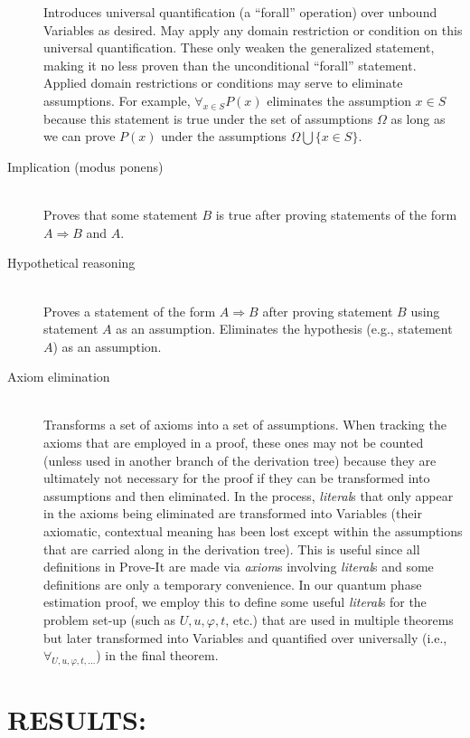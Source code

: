 \documentclass{article}[12pt]
\begin{document}
\begin{description}
  Introduces universal quantification (a “forall” operation) over unbound Variables as desired.  May apply any domain restriction or condition on this universal quantification.  These only weaken the generalized statement, making it no less proven than the unconditional “forall” statement.  Applied domain restrictions or conditions may serve to eliminate assumptions.  For example, $\forall_{x \in S} P(x)$ eliminates the assumption $x \in S$ because this statement is true under the set of assumptions $\Omega$ as long as we can prove $P(x)$ under the assumptions $\Omega \bigcup \{x \in S\}$.
\item[Implication (modus ponens)] \hfill \\
  Proves that some statement $B$ is true after proving statements of the form $A \Rightarrow B$ and $A$.
\item[Hypothetical reasoning] \hfill \\
  Proves a statement of the form $A \Rightarrow B$ after proving statement $B$ using statement $A$ as an assumption.  Eliminates the hypothesis (e.g.,  statement $A$) as an assumption.
\item[Axiom elimination] \hfill \\
  Transforms a set of axioms into a set of assumptions.  When tracking the axioms that are employed in a proof, these ones may not be counted (unless used in another branch of the derivation tree) because they are ultimately not necessary for the proof if they can be transformed into assumptions and then eliminated.  In the process, {\em literal}s that only appear in the axioms being eliminated are transformed into Variables (their axiomatic, contextual meaning has been lost except within the assumptions that are carried along in the derivation tree).  This is useful since all definitions in Prove-It are made via {\em axiom}s involving {\em literal}s and some definitions are only a temporary convenience.  In our quantum phase estimation proof, we employ this to define some useful {\em literal}s for the problem set-up (such as $U, u, \varphi, t$, etc.) that are used in multiple theorems but later transformed into Variables and quantified over universally (i.e.,
  $\forall_{U, u, \varphi, t, ...}$) in the final theorem.
  
\end{description}
  
\section*{RESULTS:}
\end{document}
